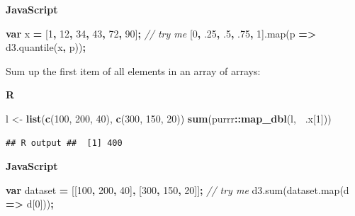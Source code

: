 \documentclass[openany]{book}
\newenvironment{Shaded}{\begin{snugshade}}{\end{snugshade}}
\newcommand{\AttributeTok}[1]{\textcolor[rgb]{0.77,0.63,0.00}{#1}}
\newcommand{\CommentTok}[1]{\textcolor[rgb]{0.56,0.35,0.01}{\textit{#1}}}
\newcommand{\DecValTok}[1]{\textcolor[rgb]{0.00,0.00,0.81}{#1}}
\newcommand{\FloatTok}[1]{\textcolor[rgb]{0.00,0.00,0.81}{#1}}
\newcommand{\KeywordTok}[1]{\textcolor[rgb]{0.13,0.29,0.53}{\textbf{#1}}}
\newcommand{\NormalTok}[1]{#1}
\newcommand{\OperatorTok}[1]{\textcolor[rgb]{0.81,0.36,0.00}{\textbf{#1}}}
\newcommand{\StringTok}[1]{\textcolor[rgb]{0.31,0.60,0.02}{#1}}
\newcommand{\VariableTok}[1]{\textcolor[rgb]{0.00,0.00,0.00}{#1}}
\begin{document}
\textbf{JavaScript}

\begin{Shaded}
\begin{Highlighting}[]
\KeywordTok{var}\NormalTok{ x }\OperatorTok{=}\NormalTok{ [}\DecValTok{1}\OperatorTok{,} \DecValTok{12}\OperatorTok{,} \DecValTok{34}\OperatorTok{,} \DecValTok{43}\OperatorTok{,} \DecValTok{72}\OperatorTok{,} \DecValTok{90}\NormalTok{]}\OperatorTok{;}      \CommentTok{// try me}
\NormalTok{[}\DecValTok{0}\OperatorTok{,} \FloatTok{.25}\OperatorTok{,} \FloatTok{.5}\OperatorTok{,} \FloatTok{.75}\OperatorTok{,} \DecValTok{1}\NormalTok{].}\AttributeTok{map}\NormalTok{(p }\OperatorTok{=>} \VariableTok{d3}\NormalTok{.}\AttributeTok{quantile}\NormalTok{(x}\OperatorTok{,}\NormalTok{ p))}\OperatorTok{;}
\end{Highlighting}
\end{Shaded}

Sum up the first item of all elements in an array of arrays:

\textbf{R}

\begin{Shaded}
\begin{Highlighting}[]
\NormalTok{l <-}\StringTok{ }\KeywordTok{list}\NormalTok{(}\KeywordTok{c}\NormalTok{(}\DecValTok{100}\NormalTok{, }\DecValTok{200}\NormalTok{, }\DecValTok{40}\NormalTok{), }\KeywordTok{c}\NormalTok{(}\DecValTok{300}\NormalTok{, }\DecValTok{150}\NormalTok{, }\DecValTok{20}\NormalTok{))}
\KeywordTok{sum}\NormalTok{(purrr}\OperatorTok{::}\KeywordTok{map_dbl}\NormalTok{(l, }\OperatorTok{~}\NormalTok{.x[}\DecValTok{1}\NormalTok{]))}
\end{Highlighting}
\end{Shaded}

\begin{verbatim}
## R output ##  [1] 400
\end{verbatim}

\textbf{JavaScript}

\begin{Shaded}
\begin{Highlighting}[]
\KeywordTok{var}\NormalTok{ dataset }\OperatorTok{=}\NormalTok{ [[}\DecValTok{100}\OperatorTok{,} \DecValTok{200}\OperatorTok{,} \DecValTok{40}\NormalTok{]}\OperatorTok{,}\NormalTok{ [}\DecValTok{300}\OperatorTok{,} \DecValTok{150}\OperatorTok{,} \DecValTok{20}\NormalTok{]]}\OperatorTok{;}     \CommentTok{// try me}
\VariableTok{d3}\NormalTok{.}\AttributeTok{sum}\NormalTok{(}\VariableTok{dataset}\NormalTok{.}\AttributeTok{map}\NormalTok{(d }\OperatorTok{=>}\NormalTok{ d[}\DecValTok{0}\NormalTok{]))}\OperatorTok{;}
\end{Highlighting}
\end{Shaded}
\end{document}
